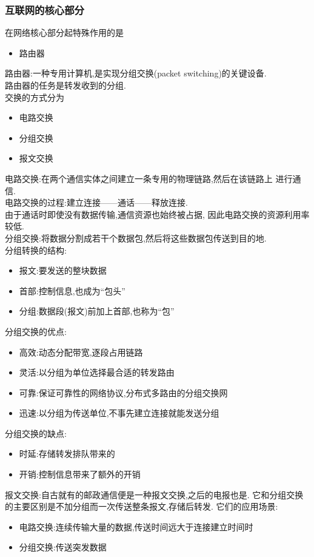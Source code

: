 \documentclass{ctexart}
\begin{document}
\subsubsection{互联网的核心部分}
在网络核心部分起特殊作用的是
\begin{itemize}
	\item 路由器
\end{itemize}
路由器:一种专用计算机,是实现分组交换(packet switching)的关键设备.\\
路由器的任务是转发收到的分组.\\
交换的方式分为
\begin{itemize}
	\item 电路交换
	\item 分组交换
	\item 报文交换
\end{itemize}
电路交换:在两个通信实体之间建立一条专用的物理链路,然后在该链路上
进行通信.\\
电路交换的过程:建立连接——通话——释放连接.\\
由于通话时即使没有数据传输,通信资源也始终被占据,
因此电路交换的资源利用率较低.\\
分组交换:将数据分割成若干个数据包,然后将这些数据包传送到目的地.\\
分组转换的结构:
\begin{itemize}
	\item 报文:要发送的整块数据
	\item 首部:控制信息,也成为“包头”
	\item 分组:数据段(报文)前加上首部,也称为“包”
\end{itemize}
分组交换的优点:
\begin{itemize}
	\item 高效:动态分配带宽,逐段占用链路
	\item 灵活:以分组为单位选择最合适的转发路由
	\item 可靠:保证可靠性的网络协议,分布式多路由的分组交换网
	\item 迅速:以分组为传送单位,不事先建立连接就能发送分组
\end{itemize}
分组交换的缺点:
\begin{itemize}
	\item 时延:存储转发排队带来的
	\item 开销:控制信息带来了额外的开销
\end{itemize}
报文交换:自古就有的邮政通信便是一种报文交换,之后的电报也是.
它和分组交换的主要区别是不加分组而一次传送整条报文,存储后转发.
它们的应用场景:
\begin{itemize}
	\item 电路交换:连续传输大量的数据,传送时间远大于连接建立时间时
	\item 分组交换:传送突发数据
\end{itemize}
\end{document}
